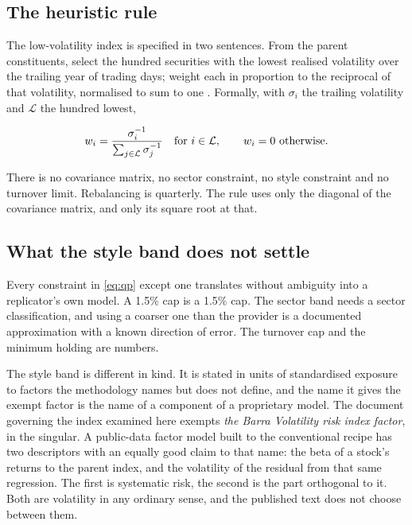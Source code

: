 \subsection{The heuristic rule}
The low-volatility index is specified in two sentences. From the parent
constituents, select the hundred securities with the lowest realised volatility
over the trailing year of trading days; weight each in proportion to the
reciprocal of that volatility, normalised to sum to one
\citep{invesco2024splv497k}. Formally, with $\sigma_i$ the trailing volatility
and $\mathcal{L}$ the hundred lowest,

\begin{equation}
 w_i = \frac{\sigma_i^{-1}}{\sum_{j\in\mathcal{L}}\sigma_j^{-1}}
 \quad \text{for } i\in\mathcal{L}, \qquad w_i = 0 \text{ otherwise.}
 \label{eq:splv}
\end{equation}

There is no covariance matrix, no sector constraint, no style constraint and no
turnover limit. Rebalancing is quarterly. The rule uses only the diagonal of
the covariance matrix, and only its square root at that.



\subsection{What the style band does not settle}
Every constraint in \eqref{eq:qp} except one translates without ambiguity into
a replicator's own model. A 1.5\% cap is a 1.5\% cap. The sector band needs a
sector classification, and using a coarser one than the provider is a
documented approximation with a known direction of error. The turnover cap and
the minimum holding are numbers.

The style band is different in kind. It is stated in units of standardised
exposure to factors the methodology names but does not define, and the name it
gives the exempt factor is the name of a component of a proprietary model. The
document governing the index examined here exempts \emph{the Barra Volatility
risk index factor}, in the singular. A public-data factor model built to the
conventional recipe has two descriptors with an equally good claim to that
name: the beta of a stock's returns to the parent index, and the volatility of
the residual from that same regression. The first is systematic risk, the
second is the part orthogonal to it. Both are volatility in any ordinary sense,
and the published text does not choose between them.

